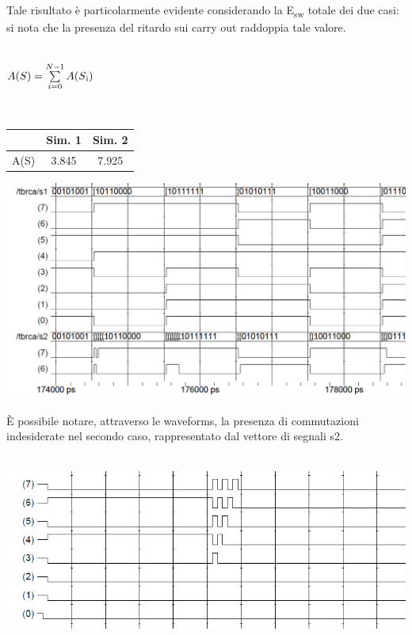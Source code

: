 \documentclass[11pt,  english, makeidx, a4paper, titlepage, oneside]{book}
\begin{document}
\\\\
Tale risultato è particolarmente evidente considerando la E\textsubscript{sw} totale dei due casi: si nota che la presenza del ritardo sui carry out raddoppia tale valore.\\\\
\centerline{$A(S) = \sum\limits_{i=0}^{N-1} A(S\textsubscript{i})$}\\
\vspace{0.2cm}
\begin{center}
\begin{tabular}{|c|c|c|}
\hline
 & Sim. 1 & Sim. 2 \\
\hline
A(S) & 3.845 & 7.925\\
\hline
\end{tabular}
\end{center}
\vspace{0.3cm}
\centerline{\includegraphics[width=15cm]{./img/Lab_1/Es_2/Glitch.png}}
\vspace{0.3cm}
È possibile notare, attraverso le waveforms, la presenza di commutazioni indesiderate nel secondo caso, rappresentato dal vettore di segnali s2.
\\\\
 \centerline{\includegraphics[width=15cm]{./img/Lab_1/Es_2/Glitch_worst_case.png}}
\\\\
\end{document}
